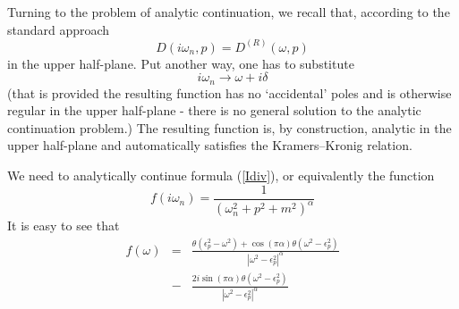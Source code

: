 Turning to the problem of analytic continuation, we recall that,
according to the standard approach \cite{AGD}
\[
D(i\omega_n,p)=D^{(R)}(\omega,p)
\]
in the upper half-plane. Put another way, one has to
substitute
\[
i\omega_n \to \omega+i\delta
\]
(that is provided the resulting function has no
`accidental' poles and is otherwise regular in the
upper
half-plane - there is no general solution to the
analytic continuation problem.)
The resulting function is, by construction, analytic
in the upper half-plane and automatically satisfies
the Kramers--Kronig relation.

We need to analytically continue formula
(\ref{Idiv}), or equivalently the function
\[
f(i\omega_n)=\frac{1}{(\omega_n^2+p^2+m^2)^\alpha}
\]
It is easy to see that
\begin{eqnarray}
f(\omega)&=&
\frac{\theta(\epsilon_p^2-\omega^2)+\cos(\pi\alpha) \theta(\omega^2-\epsilon_p^2)}{|\omega^2-\epsilon_p^2|^\alpha}
\nonumber\\ &-&
\frac{2i\sin(\pi\alpha)\theta(\omega^2- \epsilon_p^2)}{|\omega^2-\epsilon_p^2|^\alpha}
\label{fan}
\end{eqnarray}

\newpage

